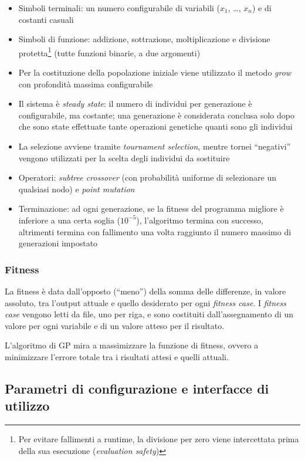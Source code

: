 \documentclass{../llncs}
\newcommand{\labelssec}[1]{\label{ssec:#1}}
\begin{document}
\begin{itemize}
\item Simboli terminali: un numero configurabile di variabili ($x_1$, \ldots, $x_n$) e di costanti casuali
\item Simboli di funzione: addizione, sottrazione, moltiplicazione e divisione protetta\footnote{Per evitare fallimenti a runtime, la divisione per zero viene intercettata prima della sua esecuzione (\emph{evaluation safety})} (tutte funzioni binarie, a due argomenti)
\item Per la costituzione della popolazione iniziale viene utilizzato il metodo \emph{grow} con profondità massima configurabile
\item Il sistema è \emph{steady state}: il numero di individui per generazione è configurabile, ma costante; una generazione è considerata conclusa solo dopo che sono state effettuate tante operazioni genetiche quanti sono gli individui
\item La selezione avviene tramite \emph{tournament selection}, mentre tornei ``negativi'' vengono utilizzati per la scelta degli individui da sostituire
\item Operatori: \emph{subtree crossover} (con probabilità uniforme di selezionare un qualsiasi nodo) e \emph{point mutation}
\item Terminazione: ad ogni generazione, se la fitness del programma migliore è inferiore a una certa soglia ($10^{-5}$), l'algoritmo termina con successo, altrimenti termina con fallimento una volta raggiunto il numero massimo di generazioni impostato
\end{itemize}

\subsubsection{Fitness}
La fitness è data dall'opposto (``meno'') della somma delle differenze, in valore assoluto, tra l'output attuale e quello desiderato per ogni \emph{fitness case}.
I \emph{fitness case} vengono letti da file, uno per riga, e sono costituiti dall'assegnamento di un valore per ogni variabile e di un valore atteso per il risultato.

L'algoritmo di GP mira a massimizzare la funzione di fitness, ovvero a minimizzare l'errore totale tra i risultati attesi e quelli attuali.

\subsection{Parametri di configurazione e interfacce di utilizzo}
\labelssec{TinyGP_parameters}
\end{document}
